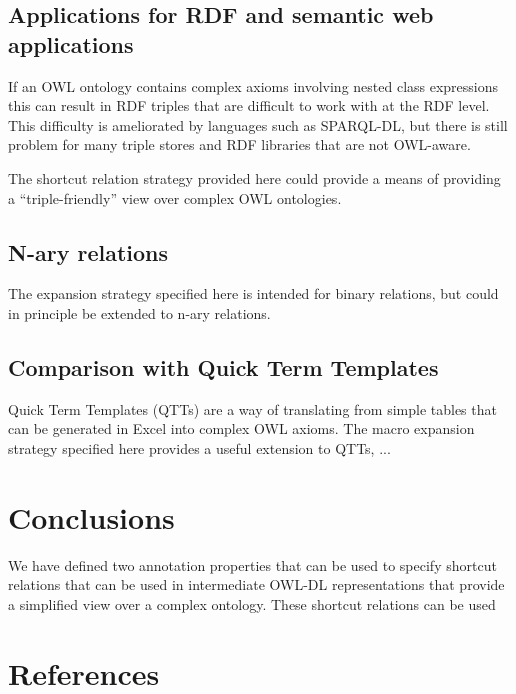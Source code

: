 \documentclass{llncs}
\begin{document}
\subsection{Applications for RDF and semantic web applications}

If an OWL ontology contains complex axioms involving nested class
expressions this can result in RDF triples that are difficult to work
with at the RDF level. This difficulty is ameliorated by languages
such as SPARQL-DL, but there is still problem for many triple stores
and RDF libraries that are not OWL-aware.

The shortcut relation strategy provided here could provide a means of
providing a ``triple-friendly'' view over complex OWL ontologies.

\subsection{N-ary relations}

The expansion strategy specified here is intended for binary
relations, but could in principle be extended to n-ary relations.

\subsection{Comparison with Quick Term Templates}

Quick Term Templates (QTTs)\cite{QTT2009} are a way of translating
from simple tables that can be generated in Excel into complex OWL
axioms. The macro expansion strategy specified here provides a useful
extension to QTTs, ...


\section{Conclusions}

We have defined two annotation properties that can be used to specify
shortcut relations that can be used in intermediate OWL-DL
representations that provide a simplified view over a complex
ontology. These shortcut relations can be used 

\section{References}



\end{document}
